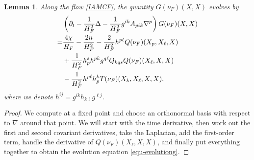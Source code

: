 \documentclass[11pt,reqno]{amsart}
\newtheorem{lemma}[proposition]{Lemma}
\theoremstyle{definition}
\theoremstyle{remark}
\numberwithin{equation}{section}
\begin{document}
	\begin{lemma}
		Along the flow \eqref{IAMCF}, the quantity $G(\nu_F)(X,X)$ evolves by
		\begin{align}
			&\left( \partial_t - \dfrac{1}{H_F^2}\Delta - \dfrac{1}{H_F^2} g^{ik}A_{pik}\nabla^p  \right)G(\nu_F)(X,X)\notag\\
			=& \dfrac{4\chi}{H_F}-\dfrac{2n}{H_F^2} -\dfrac{2}{H_F^2}h^{p\ell}Q(\nu_F)(X_p,X_{\ell},X) \notag\\
			&+\dfrac{1}{H_F^2}h^s_ph^{pk}g^{q\ell}Q_{kqs}Q(\nu_F)(X_{\ell},X,X) \nonumber\\
			&- \dfrac{1}{H_F^2} h^{p\ell}h^k_p T(\nu_F)(X_k,X_{\ell},X,X), \label{equ-evolutiong}
		\end{align}
		where we denote $h^{ij}=g^{ik}h_{k\ell}g^{\ell j}$.
	\end{lemma}
	\begin{proof}
		We compute at a fixed point and choose an orthonormal basis with respect to $\nabla$ around that point. We will start with the time derivative, then work out the first and second covariant derivatives, take the Laplacian, add the first-order term, handle the derivative of $Q(\nu_F)(X_{\ell},X,X)$, and finally put everything together to obtain the evolution equation \eqref{equ-evolutiong}.
		

\end{proof}
\end{document}
